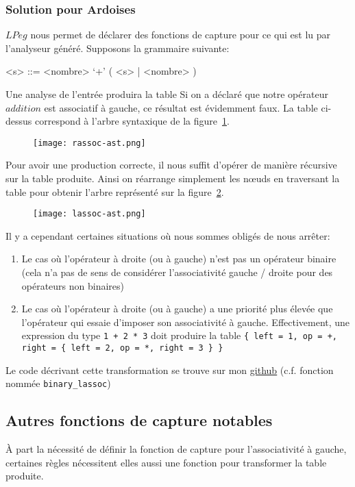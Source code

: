 \documentclass{article}
\begin{document}
\subsubsection{Solution pour Ardoises}
$LPeg$ nous permet de déclarer des fonctions de capture pour ce qui est lu par l'analyseur généré. Supposons la grammaire suivante:
\begin{grammar}
	<s> ::= <nombre> `+' ( <s> | <nombre> )
\end{grammar}
Une analyse de l'entrée  \noindent produira la table 
\noindent Si on a déclaré que notre opérateur $addition$ est associatif à gauche, ce résultat est évidemment faux. La table ci-dessus correspond à l'arbre syntaxique de la figure~\ref{fig:rassocast}. 
\begin{figure}[!h]
	\centering
	\texttt{[image: rassoc-ast.png]}
	\caption{}
	\label{fig:rassocast}
\end{figure}
Pour avoir une production correcte, il nous suffit d'opérer de manière récursive sur la table produite. Ainsi on réarrange simplement les nœuds en traversant la table pour obtenir l'arbre représenté sur la figure~\ref{fig:lassocast}.
\begin{figure}[h]
	\centering
	\texttt{[image: lassoc-ast.png]}
	\caption{}
	\label{fig:lassocast}
\end{figure}
Il y a cependant certaines situations où nous sommes obligés de nous arrêter:
\begin{enumerate}
	\item Le cas où l'opérateur à droite (ou à gauche) n'est pas un opérateur binaire (cela n'a pas de sens de considérer l'associativité gauche / droite pour des opérateurs non binaires)
	\item Le cas où l'opérateur à droite (ou à gauche) a une priorité plus élevée que l'opérateur qui essaie d'imposer son associativité à gauche. Effectivement, une expression du type \lstinline|1 + 2 * 3| doit produire la table \lstinline|{ left = 1, op = +, right = { left = 2, op = *, right = 3 } }|
\end{enumerate}
Le code décrivant cette transformation se trouve sur mon \underline{\href{https://github.com/LGabAnnell/formalisms/blob/f3cc67d58ef319d80d5895146f26f0b489c89d21/src/parser.lua\#L140}{github}} (c.f. fonction nommée \lstinline|binary_lassoc|)
\subsection{Autres fonctions de capture notables}
À part la nécessité de définir la fonction de capture pour l'associativité à gauche, certaines règles nécessitent elles aussi une fonction pour transformer la table produite.
\end{document}
